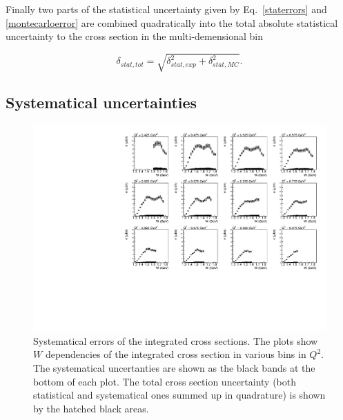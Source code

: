 \documentclass[prc,twocolumn,superscriptaddress,showpacs,amssymb,amsmath,amsfonts,linenumbers,aps]{revtex4-1}
\begin{document}
Finally two parts of the statistical uncertainty given by Eq.~\eqref{staterrors} and \eqref{montecarloerror} are combined quadratically into the total absolute statistical uncertainty to the cross section in the multi-demensional bin


\begin{equation}
\delta_{stat,tot} =
\sqrt{\delta_{stat,exp}^{2} + \delta_{stat,MC}^{2}}.
\label{errortot}
\end{equation}











\subsection{Systematical uncertainties}


\begin{figure}[htp]
\begin{center}
\includegraphics[width=15cm]{pictures/sys_err/sys_err.pdf}
\caption{\small Systematical errors of the integrated cross sections. The plots show $W$ dependencies of the integrated cross section in various bins in $Q^{2}$. The systematical uncertanties are shown as the black bands at the bottom of each plot. The total cross section uncertainty (both statistical and systematical ones summed up in quadrature) is shown by the hatched black areas.}
\label{fig:sys_err}

\end{center}
\end{figure}
\end{document}

